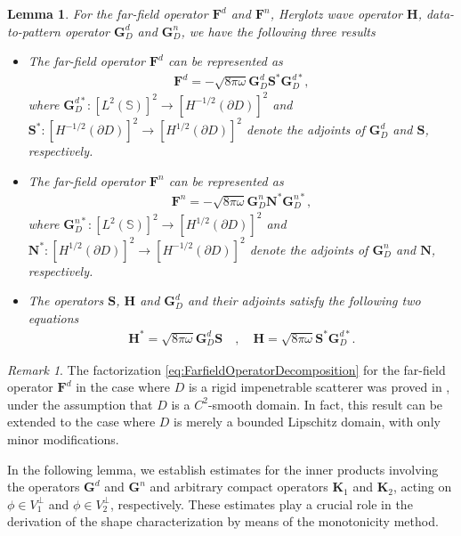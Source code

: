 \documentclass[11pt,reqno,twoside]{amsart}
\newtheorem{lem}{Lemma}[section]
\theoremstyle{definition}
\theoremstyle{remark}
\newtheorem{rem}{Remark}[section]
\numberwithin{equation}{section}
\newcommand{\bmf}[1]{{\mathbf{#1}}}
\begin{document}
\begin{lem}\label{Fdecomposition}
For the far-field operator $\mathbf F^d$ and $\mathbf F^n$, Herglotz wave operator $\mathbf H$, data-to-pattern operator $\mathbf G_D^d$ and $\mathbf G_D^n$, we have the following three results
\begin{itemize}
\item [(1).] The far-field operator $\mathbf F^d$ can be represented as
\begin{align}\label{eq:FarfieldOperatorDecomposition}
 \mathbf F^d=-\sqrt{8\pi\omega}\mathbf{G}_D^d \bmf{S}^*\bmf{G}_D^{d*},
\end{align}
where $\bmf{G}_D^{d*}:\left[L^2\left(\mathbb S\right) \right] ^2 \to \left[H^{-1/2}\left(\partial D\right) \right] ^2$ and $\mathbf{S^*}:\left[H^{-1/2}\left(\partial D\right) \right] ^2 \to \left[H^{1/2}\left(\partial D\right) \right] ^2$ denote the adjoints of $\mathbf G_D^d$ and $\mathbf S$, respectively. 
\item [(2).] The far-field operator $\mathbf F^n$ can be represented as
\begin{align*}%
 \mathbf F^n=-\sqrt{8\pi\omega}\mathbf{G}_D^n \bmf{N}^*\bmf{G}_D^{n*},
\end{align*}
where $\bmf{G}_D^{n*}:\left[L^2\left(\mathbb S\right) \right] ^2 \to \left[H^{1/2}\left(\partial D\right) \right] ^2$ and $\mathbf{N^*}:\left[H^{1/2}\left(\partial D\right) \right] ^2 \to \left[H^{-1/2}\left(\partial D\right) \right] ^2$ denote the adjoints of $\mathbf G_D^n$ and $\mathbf N$, respectively. 
\item [(3).] The operators $\mathbf S$, $\mathbf H$ and $\mathbf G_D^d$ and their adjoints satisfy the following two equations
\begin{align}\label{eq:HGSoperator}
	\mathbf{H^*}=\sqrt{8\pi\omega}\mathbf G_D^d \mathbf S\quad, \quad \mathbf{H}=\sqrt{8\pi\omega}\mathbf{S^*} \mathbf G_D^{d*}.
\end{align}
\end{itemize}
\end{lem}
\begin{rem}
The factorization \eqref{eq:FarfieldOperatorDecomposition} for the far-field operator $\mathbf{F}^d$ in the case where $D$ is a rigid impenetrable scatterer was proved in \cite{Aren01}, under the assumption that $D$ is a $C^2$-smooth domain. In fact, this result can be extended to the case where $D$ is merely a bounded Lipschitz domain, with only minor modifications.
\end{rem}
In the following lemma, we establish estimates for the inner products involving the operators $\mathbf{G}^d$ and $\mathbf{G}^n$ and arbitrary compact operators $\mathbf{K}_1$ and $\mathbf{K}_2$, acting on $\phi \in V_1^\perp$ and $\phi \in V_2^\perp$, respectively. These estimates play a crucial role in the derivation of the shape characterization by means of the monotonicity method.
    
\end{document}

